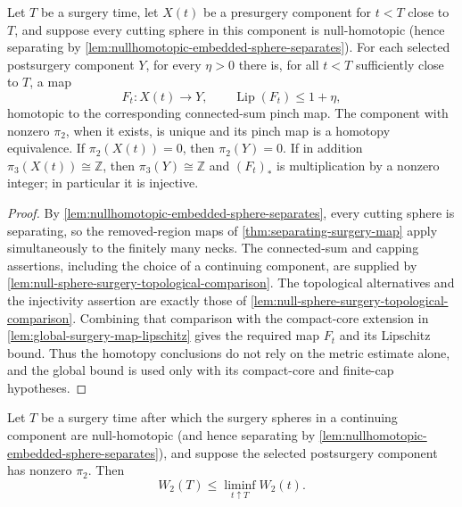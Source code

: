 \begin{theorem}
\label{thm:trivial-surgery-component-map}
\notready
Let $T$ be a surgery time, let $X(t)$ be a presurgery component for $t<T$
close to $T$, and suppose every cutting sphere in this component is
null-homotopic (hence separating by
\ref{lem:nullhomotopic-embedded-sphere-separates}).  For each selected
postsurgery component $Y$, for every
$\eta>0$ there is, for all
$t<T$ sufficiently close to $T$, a map
\[
 F_t\colon X(t)\longrightarrow Y,
 \qquad \operatorname{Lip}(F_t)\le1+\eta,
\]
homotopic to the corresponding connected-sum pinch map.  The component with
nonzero $\pi_2$, when it exists, is unique and its pinch map is a homotopy
equivalence.  If $\pi_2(X(t))=0$, then $\pi_2(Y)=0$.  If in addition
$\pi_3(X(t))\cong\mathbb Z$, then $\pi_3(Y)\cong\mathbb Z$ and $(F_t)_*$ is
multiplication by a nonzero integer; in particular it is injective.
\end{theorem}

\begin{proof}
By \ref{lem:nullhomotopic-embedded-sphere-separates}, every cutting sphere is
separating, so the removed-region maps of
\ref{thm:separating-surgery-map} apply simultaneously to the finitely many
necks.  The connected-sum and capping assertions, including the choice of a
continuing component, are supplied by
  \ref{lem:null-sphere-surgery-topological-comparison}.  The topological
  alternatives and the injectivity assertion are exactly
  those of \ref{lem:null-sphere-surgery-topological-comparison}.  Combining
  that comparison with the compact-core extension in
  \ref{lem:global-surgery-map-lipschitz} gives the required map $F_t$ and its
  Lipschitz bound.  Thus the homotopy conclusions do not rely on the metric
  estimate alone, and the global bound is used only with its compact-core and
  finite-cap hypotheses.
\end{proof}

\begin{lemma}
\label{lem:two-sphere-width-surgery-control}
\notready
Let $T$ be a surgery time after which the surgery spheres in a continuing
component are null-homotopic (and hence separating by
\ref{lem:nullhomotopic-embedded-sphere-separates}), and suppose the selected
postsurgery component
has nonzero $\pi_2$.  Then
\[
 W_2(T)\le\liminf_{t\uparrow T}W_2(t).
\]
\end{lemma}

